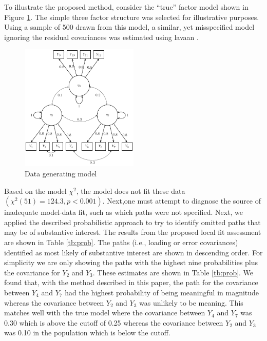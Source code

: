 \documentclass[man, noextraspace, floatsintext, 12pt]{apa7}
\begin{document}
To illustrate the proposed method, consider the ``true'' factor model shown in Figure \ref{fig:model}.
The simple three factor structure was selected for illustrative purposes. 
Using a sample of 500 drawn from this model, a similar, yet misspecified model ignoring the residual covariances was estimated using \textsf{lavaan} \citep{Rosseel2012}.
\begin{figure}
\centering
\includegraphics[width=0.5\textwidth]{fig/sim_factor_structure_values}
\caption{Data generating model}
\label{fig:model}
\end{figure}
Based on the model $\chi^2$, the model does not fit these data $(\chi^2(51) = 124.3, p < 0.001)$.
Next,one must attempt to diagnose the source of inadequate model-data fit, such as which paths were not specified.
Next, we applied the described probabilistic approach to try to identify omitted paths that may be of substantive interest. 
The results from the proposed local fit assessment are shown in Table \ref{tb:prob}. 
The paths (i.e., loading or  error covariances) identified as most likely of substantive interest are shown in descending order.
For simplicity we are only showing the paths with the highest nine probabilities plus the covariance for $Y_2$ and $Y_3$.
These estimates are shown in Table \ref{tb:prob}.
We found that, with the method described in this paper, the path for the covariance between $Y_4$ and $Y_7$ had the highest probability of being meaningful in magnitude whereas the covariance between $Y_2$ and $Y_3$ was unlikely to be meaning.
This matches well with the true model where the covariance between $Y_4$ and $Y_7$ was 0.30 which is above the cutoff of 0.25 whereas the covariance between $Y_2$ and $Y_3$ was 0.10 in the population which is below the cutoff.
\end{document}
